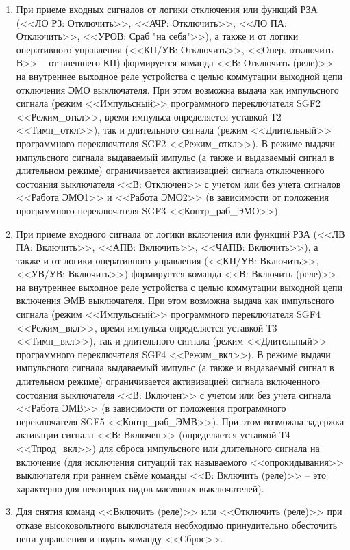 \begin{enumerate}
{\begin{enumerate}
\item
При приеме входных сигналов от логики отключения или функций РЗА (<<ЛО РЗ: Отключить>>, <<АЧР: Отключить>>, <<ЛО ПА: Отключить>>, <<УРОВ: Сраб "на себя">>), а также и от логики оперативного управления (<<КП/УВ: Отключить>>, <<Опер. отключить В>> -- от внешнего КП) формируется команда <<В: Отключить (реле)>> на внутреннее выходное реле устройства с целью коммутации выходной цепи отключения ЭМО выключателя. При этом возможна выдача как импульсного сигнала (режим <<Импульсный>> программного переключателя SGF2 <<Режим\_откл>>, время импульса определяется уставкой Т2 <<Тимп\_откл>>), так и длительного сигнала (режим <<Длительный>> программного переключателя SGF2 <<Режим\_откл>>). 
В режиме выдачи импульсного сигнала выдаваемый импульс (а также и выдаваемый сигнал в длительном режиме) ограничивается активизацией сигнала отключенного состояния выключателя <<В: Отключен>> с учетом или без учета сигналов <<Работа ЭМО1>> и <<Работа ЭМО2>> (в зависимости от положения программного переключателя SGF3 <<Контр\_раб\_ЭМО>>).
\item
При приеме входного сигнала от логики включения или функций РЗА (<<ЛВ ПА: Включить>>, <<АПВ: Включить>>, <<ЧАПВ: Включить>>), а также и от логики оперативного управления (<<КП/УВ: Включить>>, <<УВ/УВ: Включить>>) формируется команда <<В: Включить (реле)>> на внутреннее выходное реле устройства с целью коммутации выходной цепи включения ЭМВ выключателя. При этом возможна выдача как импульсного сигнала (режим <<Импульсный>> программного переключателя SGF4 <<Режим\_вкл>>, время импульса определяется уставкой Т3 <<Тимп\_вкл>>), так и длительного сигнала (режим <<Длительный>> программного переключателя SGF4 <<Режим\_вкл>>).
В режиме выдачи импульсного сигнала выдаваемый импульс (а также и выдаваемый сигнал в длительном режиме) ограничивается активизацией сигнала включенного состояния выключателя <<В: Включен>> с учетом или без учета сигнала <<Работа ЭМВ>> (в зависимости от положения программного переключателя SGF5 <<Контр\_раб\_ЭМВ>>). При этом возможна задержка активации сигнала <<В: Включен>> (определяется уставкой Т4 <<Тпрод\_вкл>>) для сброса импульсного или длительного сигнала на включение (для исключения ситуаций так называемого <<опрокидывания>> выключателя при раннем съёме команды <<В: Включить (реле)>> -- это характерно для некоторых видов масляных выключателей).
\item
Для снятия команд <<Включить (реле)>> или <<Отключить (реле)>> при отказе высоковольтного выключателя необходимо принудительно обесточить цепи управления и подать команду <<Сброс>>.

\end{enumerate}}
\end{enumerate}
